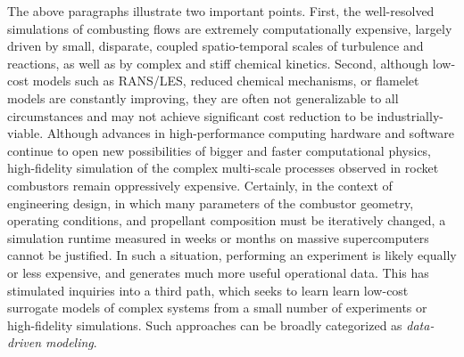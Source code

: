 The above paragraphs illustrate two important points. First, the well-resolved simulations of combusting flows are extremely computationally expensive, largely driven by small, disparate, coupled spatio-temporal scales of turbulence and reactions, as well as by complex and stiff chemical kinetics. Second, although low-cost models such as RANS/LES, reduced chemical mechanisms, or flamelet models are constantly improving, they are often not generalizable to all circumstances and may not achieve significant cost reduction to be industrially-viable. Although advances in high-performance computing hardware and software continue to open new possibilities of bigger and faster computational physics, high-fidelity simulation of the complex multi-scale processes observed in rocket combustors remain oppressively expensive. Certainly, in the context of engineering design, in which many parameters of the combustor geometry, operating conditions, and propellant composition must be iteratively changed, a simulation runtime measured in weeks or months on massive supercomputers cannot be justified. In such a situation, performing an experiment is likely equally or less expensive, and generates much more useful operational data. This has stimulated inquiries into a third path, which seeks to learn learn low-cost surrogate models of complex systems from a small number of experiments or high-fidelity simulations. Such approaches can be broadly categorized as \textit{data-driven modeling}.